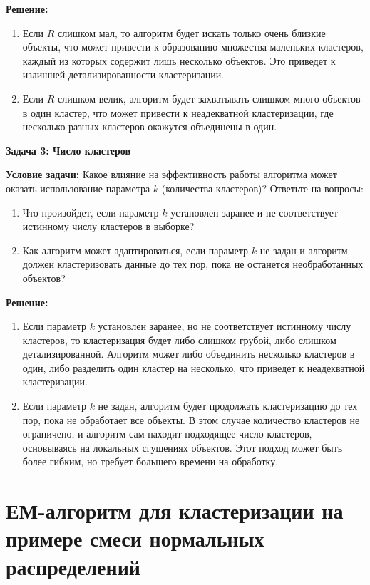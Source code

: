 \textbf{Решение:}
\begin{enumerate}
    \item Если \( R \) слишком мал, то алгоритм будет искать только очень близкие объекты, что может привести к образованию множества маленьких кластеров, каждый из которых содержит лишь несколько объектов. Это приведет к излишней детализированности кластеризации.
    \item Если \( R \) слишком велик, алгоритм будет захватывать слишком много объектов в один кластер, что может привести к неадекватной кластеризации, где несколько разных кластеров окажутся объединены в один.
\end{enumerate}

\vspace{1em}

\textbf{Задача 3: Число кластеров}

\textbf{Условие задачи:}
Какое влияние на эффективность работы алгоритма может оказать использование параметра \( k \) (количества кластеров)? Ответьте на вопросы:
\begin{enumerate}
    \item Что произойдет, если параметр \( k \) установлен заранее и не соответствует истинному числу кластеров в выборке?
    \item Как алгоритм может адаптироваться, если параметр \( k \) не задан и алгоритм должен кластеризовать данные до тех пор, пока не останется необработанных объектов?
\end{enumerate}

\textbf{Решение:}
\begin{enumerate}
    \item Если параметр \( k \) установлен заранее, но не соответствует истинному числу кластеров, то кластеризация будет либо слишком грубой, либо слишком детализированной. Алгоритм может либо объединить несколько кластеров в один, либо разделить один кластер на несколько, что приведет к неадекватной кластеризации.
    \item Если параметр \( k \) не задан, алгоритм будет продолжать кластеризацию до тех пор, пока не обработает все объекты. В этом случае количество кластеров не ограничено, и алгоритм сам находит подходящее число кластеров, основываясь на локальных сгущениях объектов. Этот подход может быть более гибким, но требует большего времени на обработку.
\end{enumerate}


\section{ЕМ-алгоритм для кластеризации на примере смеси нормальных распределений}

